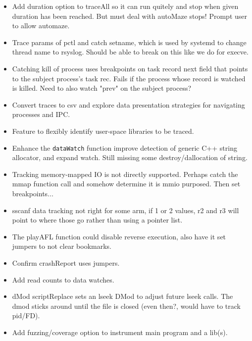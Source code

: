 \documentclass[titlepage]{article}
\begin{document}
\begin{appendices}
\begin{itemize}
\item Add duration option to traceAll so it can run quitely and stop when given duration has been reached.  But must deal with
autoMaze stops!  Prompt user to allow automaze.

\item Trace params of pctl and catch setname, which is used by systemd to change thread name to rsyslog.  Should be able to 
break on this like we do for execve.

\item Catching kill of process uses breakpoints on task record next field that points to the subject process's task rec.  Fails if the
process whose record is watched is killed.  Need to also watch "prev" on the subject process?

\item Convert traces to csv and explore data presentation strategies for navigating processes and IPC.

\item Feature to flexibly identify user-space libraries to be traced.

\item Enhance the {\tt dataWatch} function improve detection of generic C++ string allocator, and expand watch.  Still missing some destroy/dallocation
of string.

\item Tracking memory-mapped IO is not directly supported.  Perhaps catch the mmap function call and somehow determine it is mmio purposed.  Then
set breakpoints...

\item sscanf data tracking not right for some arm, if 1 or 2 values, r2 and r3 will point to where those go rather than using a pointer list.

\item The playAFL function could disable reverse execution, also have it set jumpers to not clear bookmarks.

\item Confirm crashReport uses jumpers.

\item Add read counts to data watches.

\item dMod scriptReplace sets an lseek DMod to adjust future lseek calls.  The dmod sticks around until the file is closed (even then?, would 
have to track pid/FD).

\item Add fuzzing/coverage option to instrument main program and a lib(s).


\end{itemize}
\end{appendices}
\end{document}
